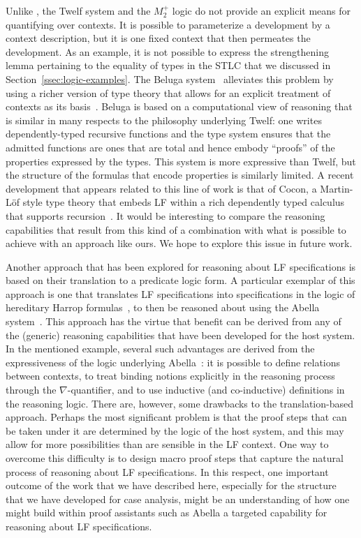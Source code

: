 Unlike \logic, the Twelf system and the $M_2^+$ logic do not
provide an explicit means for quantifying over contexts. It is
possible to parameterize a development by a context description, but
it is one fixed context that then permeates the development.
%
As an example, it is not possible to express the strengthening lemma 
pertaining to the equality of types in the STLC that we discussed in
Section~\ref{ssec:logic-examples}.
%
The Beluga system~\cite{pientka10ijcar} alleviates this problem by using
a richer version of type theory that allows for an explicit treatment
of contexts as its basis~\cite{nanevski08tocl}.
%
Beluga is based on a computational view of reasoning that is similar
in many respects to the philosophy underlying Twelf: one writes
dependently-typed recursive functions and the type system ensures that
the admitted 
functions are ones that are total and hence embody ``proofs'' of the
properties expressed by the types. 
%
This system is more expressive than Twelf, but the structure of the
formulas that encode properties is similarly limited. 
%
A recent development that appears related to this line of work is that
of {\sc Cocon}, a Martin-L\"{o}f style type theory that embeds LF within
a rich dependently typed calculus that supports
recursion~\cite{pientka2019arxiv}. 
%
It would be interesting to compare the reasoning capabilities that
result from this kind of a combination with what is possible to
achieve with an approach like ours.
%
We hope to explore this issue in future work.

Another approach that has been explored for reasoning about LF
specifications is based on their translation to a predicate logic
form.
%
A particular exemplar of this approach is one that translates LF
specifications into specifications in the logic of hereditary Harrop 
formulas~\cite{miller12proghol}, to then be reasoned about using the
Abella system~\cite{southern14fsttcs}.
% 
This approach has the virtue that benefit can be derived from any of
the (generic) reasoning capabilities that have been developed for the
host system. 
%
In the mentioned example, several such advantages are derived from the
expressiveness of the logic underlying Abella~\cite{gacek11ic}: 
it is possible to define relations between contexts, to treat
binding notions explicitly in the reasoning process through the
$\nabla$-quantifier, and to use inductive (and co-inductive)
definitions in the reasoning logic.
%
There are, however, some drawbacks to the translation-based
approach. 
%
Perhaps the most significant problem is that the proof steps that can
be taken under it are determined by the logic of the host system, and
this may allow for more possibilities than are sensible in the LF
context.  
%
One way to overcome this difficulty is to design macro proof steps
that capture the natural process of reasoning about LF
specifications. 
%
In this respect, one important outcome of the work that we have
described here, especially for the structure that we have developed
for case analysis, might be an understanding of how one might
build within proof assistants such as Abella a targeted
capability for reasoning about LF specifications. 
